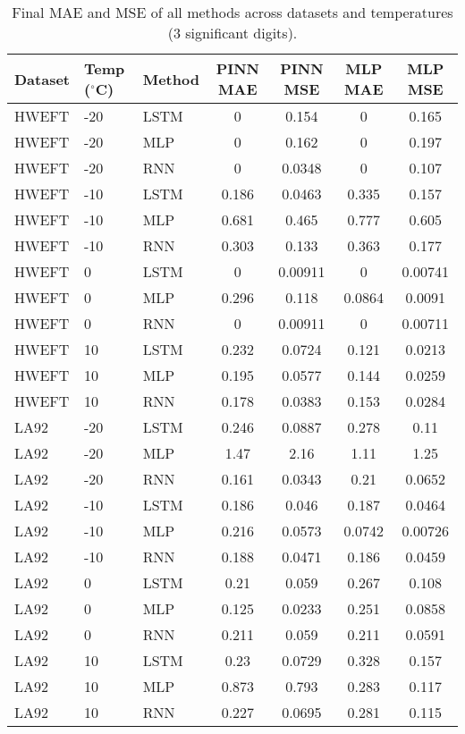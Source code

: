 \begin{table*}[htbp]
\centering
\caption{Final MAE and MSE of all methods across datasets and temperatures (3 significant digits).}
\label{tab:all_results_3sig}
\begin{tabular}{lllcccc}
\toprule
Dataset & Temp ($^\circ$C) & Method & PINN MAE & PINN MSE & MLP MAE & MLP MSE \\
\midrule
HWEFT & -20 & LSTM & 0 & 0.154 & 0 & 0.165 \\
HWEFT & -20 & MLP & 0 & 0.162 & 0 & 0.197 \\
HWEFT & -20 & RNN & 0 & 0.0348 & 0 & 0.107 \\
HWEFT & -10 & LSTM & 0.186 & 0.0463 & 0.335 & 0.157 \\
HWEFT & -10 & MLP & 0.681 & 0.465 & 0.777 & 0.605 \\
HWEFT & -10 & RNN & 0.303 & 0.133 & 0.363 & 0.177 \\
HWEFT & 0 & LSTM & 0 & 0.00911 & 0 & 0.00741 \\
HWEFT & 0 & MLP & 0.296 & 0.118 & 0.0864 & 0.0091 \\
HWEFT & 0 & RNN & 0 & 0.00911 & 0 & 0.00711 \\
HWEFT & 10 & LSTM & 0.232 & 0.0724 & 0.121 & 0.0213 \\
HWEFT & 10 & MLP & 0.195 & 0.0577 & 0.144 & 0.0259 \\
HWEFT & 10 & RNN & 0.178 & 0.0383 & 0.153 & 0.0284 \\
LA92 & -20 & LSTM & 0.246 & 0.0887 & 0.278 & 0.11 \\
LA92 & -20 & MLP & 1.47 & 2.16 & 1.11 & 1.25 \\
LA92 & -20 & RNN & 0.161 & 0.0343 & 0.21 & 0.0652 \\
LA92 & -10 & LSTM & 0.186 & 0.046 & 0.187 & 0.0464 \\
LA92 & -10 & MLP & 0.216 & 0.0573 & 0.0742 & 0.00726 \\
LA92 & -10 & RNN & 0.188 & 0.0471 & 0.186 & 0.0459 \\
LA92 & 0 & LSTM & 0.21 & 0.059 & 0.267 & 0.108 \\
LA92 & 0 & MLP & 0.125 & 0.0233 & 0.251 & 0.0858 \\
LA92 & 0 & RNN & 0.211 & 0.059 & 0.211 & 0.0591 \\
LA92 & 10 & LSTM & 0.23 & 0.0729 & 0.328 & 0.157 \\
LA92 & 10 & MLP & 0.873 & 0.793 & 0.283 & 0.117 \\
LA92 & 10 & RNN & 0.227 & 0.0695 & 0.281 & 0.115 \\

\end{tabular}
\end{table*}

